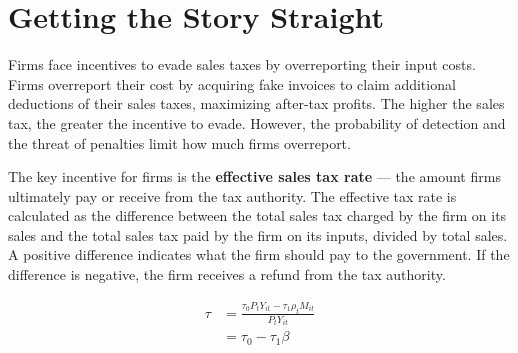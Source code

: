 \documentclass[
  12pt]{article}
\theoremstyle{definition}
\theoremstyle{remark}
\begin{document}
\begin{table}

\caption{\label{tbl-np-deconv}Semiparametric Deconvolution of Tax
Evasion using Penalized B-Splines. I used a kernel density estimator to
fit the error density on the residuals of the first stage conditional on
firms being Non-Evaders.}


\end{table}%

\section{Getting the Story Straight}\label{getting-the-story-straight}

Firms face incentives to evade sales taxes by overreporting their input
costs. Firms overreport their cost by acquiring fake invoices to claim
additional deductions of their sales taxes, maximizing after-tax
profits. The higher the sales tax, the greater the incentive to evade.
However, the probability of detection and the threat of penalties limit
how much firms overreport.

The key incentive for firms is the \textbf{effective sales tax rate} ---
the amount firms ultimately pay or receive from the tax authority. The
effective tax rate is calculated as the difference between the total
sales tax charged by the firm on its sales and the total sales tax paid
by the firm on its inputs, divided by total sales. A positive difference
indicates what the firm should pay to the government. If the difference
is negative, the firm receives a refund from the tax authority.

\[
\begin{aligned}
\tau &= \frac{\tau_0P_tY_{it} - \tau_1\rho_t M_{it}}{P_tY_{it}} \\
&= \tau_0 - \tau_1 \beta
\end{aligned}
\]
\end{document}
